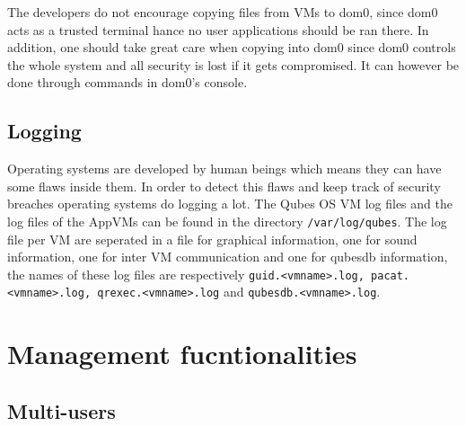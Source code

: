 \documentclass[runningheads,a4paper]{article}
\begin{document}

The developers do not encourage copying files from VMs to dom0, since
dom0 acts as a trusted terminal hance no user applications should be
ran there.  In addition, one should take great care when copying into
dom0 since dom0 controls the whole system and all security is lost if
it gets compromised.  It can however be done through commands in dom0's console.  

\subsection{Logging}

Operating systems are developed by human beings which means they can
have some flaws inside them. In order to detect this flaws and keep
track of security breaches operating systems do logging a lot. The
Qubes OS VM log files and the log files of the AppVMs can be found in
the directory \texttt{/var/log/qubes}. The log file per VM are
seperated in a file for graphical information, one for sound
information, one for inter VM communication and one for qubesdb
information, the names of these log files are respectively
\texttt{guid.<vmname>.log, pacat.<vmname>.log, qrexec.<vmname>.log}
and \texttt{qubesdb.<vmname>.log}.

\section{Management fucntionalities}
\subsection{Multi-users} 
\end{document}
